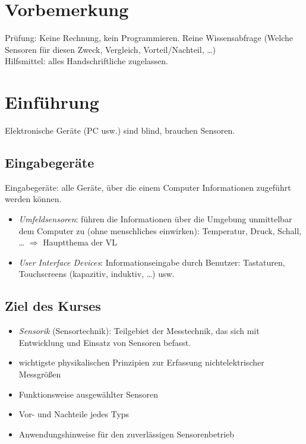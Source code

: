 \newcommand{\customDir}{../}





%



\maketitle
\newpage
\tableofcontents
\newpage

\chapter*{Vorbemerkung}
Prüfung: Keine Rechnung, kein Programmieren. Reine Wissensabfrage (Welche Sensoren für diesen Zweck, Vergleich, Vorteil/Nachteil, …)\\
Hilfsmittel: alles Handschriftliche zugelassen.

\setcounter{chapter}{-1}
\chapter{Einführung}

Elektronische Geräte (PC usw.) sind blind, brauchen Sensoren.

\section{Eingabegeräte}
Eingabegeräte: alle Geräte, über die einem Computer Informationen zugeführt werden können.
\begin{itemize}
\item \emph{Umfeldsensoren}: führen die Informationen über die Umgebung unmittelbar dem Computer zu (ohne menschliches einwirken): Temperatur, Druck, Schall, … $\Rightarrow$ Hauptthema der VL
\item \emph{User Interface Devices}: Informationseingabe durch Benutzer: Tastaturen, Touchscreens (kapazitiv, induktiv, …) usw.
\end{itemize}

\section{Ziel des Kurses}
\begin{itemize}
\item \emph{Sensorik} (Sensortechnik): Teilgebiet der Messtechnik, das sich mit Entwicklung und Einsatz von Sensoren befasst.
\item wichtigste physikalischen Prinzipien zur Erfassung nichtelektrischer Messgrößen
\item Funktionsweise ausgewählter Sensoren
\item Vor- und Nachteile jedes Typs
\item Anwendungshinweise für den zuverlässigen Sensorenbetrieb
\end{itemize}

